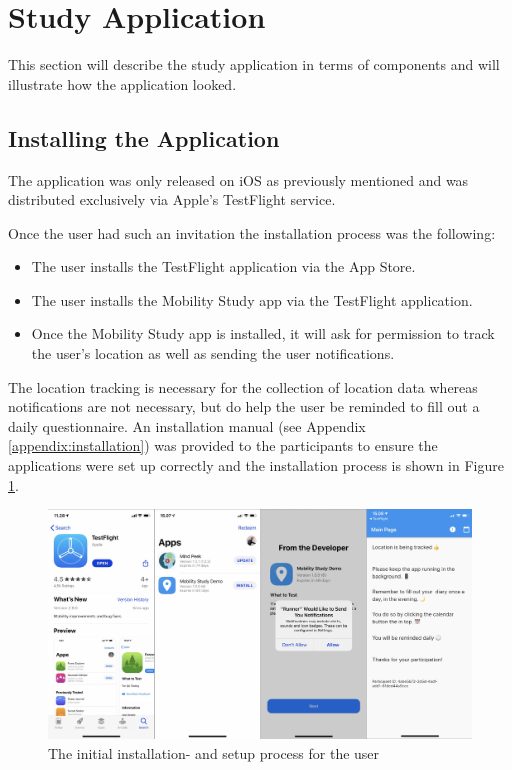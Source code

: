 \section{Study Application}
This section will describe the study application in terms of components and will illustrate how the application looked.

\subsection{Installing the Application}
The application was only released on iOS as previously mentioned and was distributed exclusively via Apple's TestFlight service. 

Once the user had such an invitation the installation process was the following: 
\begin{itemize}
    
    \item The user installs the TestFlight application via the App Store.
    
    \item The user installs the Mobility Study app via the TestFlight application.
    
    \item Once the Mobility Study app is installed, it will ask for permission to track the user's location as well as sending the user notifications. 
    
\end{itemize}
The location tracking is necessary for the collection of location data whereas notifications are not necessary, but do help the user be reminded to fill out a daily questionnaire. An installation manual (see Appendix \ref{appendix:installation}) was provided to the participants to ensure the applications were set up correctly and the installation process is shown in Figure \ref{fig:screens-install}.

\begin{figure}[h]
    \centering
    \includegraphics[width=\textwidth]{images/app_imgs/screens-install.pdf}
    \caption{The initial installation- and setup process for the user}
    \label{fig:screens-install}
\end{figure}

